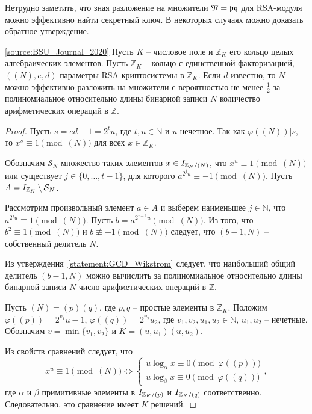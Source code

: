 \documentclass[_00_dissertation.tex]{subfiles}
\begin{document}
Нетрудно заметить, что зная разложение на множители $\mathfrak{N} = \mathfrak{p}\mathfrak{q}$ для RSA-модуля можно эффективно найти секретный ключ.
В некоторых случаях можно доказать обратное утверждение.

\begin{theorem}\label{theorem:factor}\ref{source:BSU_Journal_2020}
    Пусть $K$ -- числовое поле и $\mathbb{Z}_K$ его кольцо целых алгебраических элементов.
    Пусть $\mathbb{Z}_K$ -- кольцо с единственной факторизацией, $((N), e, d)$ параметры RSA-криптосистемы в $\mathbb{Z}_K$.
    Если $d$ известно, то $N$ можно эффективно разложить на множители с вероятностью не менее $\frac{1}{2}$ за полиномиальное относительно длины бинарной записи $N$ количество арифметических операций в $\mathbb{Z}$.
\end{theorem}
\begin{proof}
    Пусть $s = ed - 1 = 2^t u$, где $t, u \in \mathbb{N}$ и $u$ нечетное.
    Так как $\varphi((N)) | s$, то $x^s \equiv 1 \pmod{(N)}$ для всех $x \in \mathbb{Z}_K$.
    
    Обозначим $\mathcal{S}_N$ множество таких элементов $x \in I_{\mathbb{Z}_N / (N)}$, что $x^u \equiv 1 \pmod{(N)}$ или существует $j \in \{0, \dots, t-1\}$, для которого $a^{2^j u} \equiv -1 \pmod{(N)}$.
    Пусть $A = I_{\mathbb{Z}_K} \setminus \mathcal{S}_N$.
    
    Рассмотрим произвольный элемент $a \in A$ и выберем наименьшее $j \in \mathbb{N}$, что $a^{2^j u} \equiv 1 \pmod{(N)}$.
    Пусть $b = a^{2^{j-1} u} \pmod{(N)}$.
    Из того, что $b^2 \equiv 1 \pmod{(N)}$ и $b \not\equiv \pm 1 \pmod{(N)}$ следует, что $(b - 1, N)$ -- собственный делитель $N$.

    Из утверждения~\ref{statement:GCD_Wikstrom} следует, что наибольший общий делитель $(b - 1, N)$ можно вычислить за полиномиальное относительно длины бинарной записи $N$ число арифметических операций в $\mathbb{Z}$.
    
    Пусть $(N) = (p)(q)$, где $p, q$ -- простые элементы в $\mathbb{Z}_K$.
    Положим $\varphi((p)) = 2^{v_1} u-1$, $\varphi((q)) = 2^{v_2} u_2$, где $v_1, v_2, u_1, u_2 \in \mathbb{N}$, $u_1, u_2$ -- нечетные.
    Обозначим $v = \min\{v_1, v_2\}$ и $K = (u, u_1)(u, u_2)$.
    
    Из свойств сравнений следует, что
    \begin{equation*}
        x^u \equiv 1 \pmod{(N)}
        \Leftrightarrow
        \begin{cases}
            u \log_{\alpha} x \equiv 0 \pmod{\varphi((p))}\\
            u \log_{\beta} x \equiv 0 \pmod{\varphi((q))}
        \end{cases},
    \end{equation*}
    где $\alpha$ и $\beta$ примитивные элементы в $I_{\mathbb{Z}_K / (p)}$ и $I_{\mathbb{Z}_K / (q)}$ соответственно.
    Следовательно, это сравнение имеет $K$ решений.
    

\end{proof}
\end{document}
